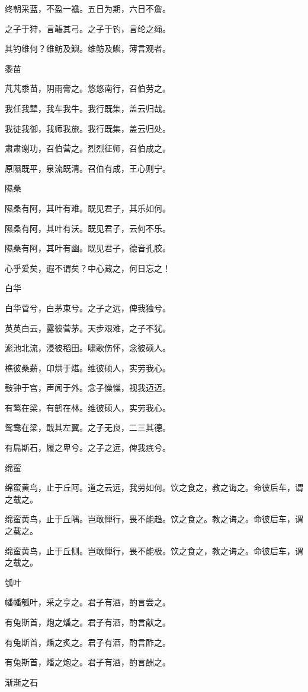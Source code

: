 终朝采蓝，不盈一襜。五日为期，六日不詹。

之子于狩，言韔其弓。之子于钓，言纶之绳。

其钓维何？维鲂及鱮。维鲂及鱮，薄言观者。

黍苗

芃芃黍苗，阴雨膏之。悠悠南行，召伯劳之。

我任我辇，我车我牛。我行既集，盖云归哉。

我徒我御，我师我旅。我行既集，盖云归处。

肃肃谢功，召伯营之。烈烈征师，召伯成之。

原隰既平，泉流既清。召伯有成，王心则宁。

隰桑

隰桑有阿，其叶有难。既见君子，其乐如何。

隰桑有阿，其叶有沃。既见君子，云何不乐。

隰桑有阿，其叶有幽。既见君子，德音孔胶。

心乎爱矣，遐不谓矣？中心藏之，何日忘之！

白华

白华菅兮，白茅束兮。之子之远，俾我独兮。

英英白云，露彼菅茅。天步艰难，之子不犹。

滮池北流，浸彼稻田。啸歌伤怀，念彼硕人。

樵彼桑薪，卬烘于煁。维彼硕人，实劳我心。

鼓钟于宫，声闻于外。念子懆懆，视我迈迈。

有鹙在梁，有鹤在林。维彼硕人，实劳我心。

鸳鸯在梁，戢其左翼。之子无良，二三其德。

有扁斯石，履之卑兮。之子之远，俾我疧兮。

绵蛮

绵蛮黄鸟，止于丘阿。道之云远，我劳如何。饮之食之，教之诲之。命彼后车，谓之载之。

绵蛮黄鸟，止于丘隅。岂敢惮行，畏不能趋。饮之食之。教之诲之。命彼后车，谓之载之。

绵蛮黄鸟，止于丘侧。岂敢惮行，畏不能极。饮之食之，教之诲之。命彼后车，谓之载之。

瓠叶

幡幡瓠叶，采之亨之。君子有酒，酌言尝之。

有兔斯首，炮之燔之。君子有酒，酌言献之。

有兔斯首，燔之炙之。君子有酒，酌言酢之。

有兔斯首，燔之炮之。君子有酒，酌言酬之。

渐渐之石

